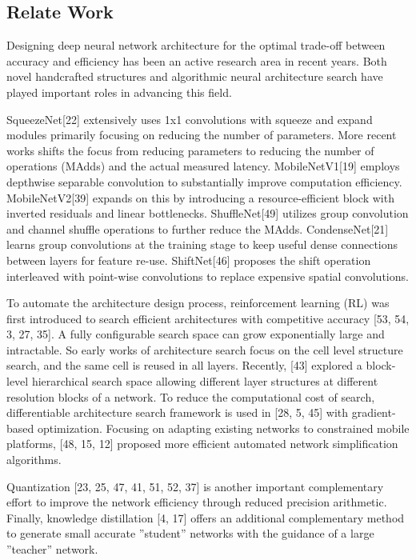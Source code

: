 \subsection{Relate Work}

Designing deep neural network architecture for the optimal trade-off between accuracy and efficiency has been
an active research area in recent years. Both novel handcrafted structures and algorithmic neural architecture search
have played important roles in advancing this field.

SqueezeNet[22] extensively uses 1x1 convolutions with squeeze and expand modules primarily focusing on reducing
the number of parameters. More recent works shifts the focus from reducing parameters to reducing
the number of operations (MAdds) and the actual measured latency. MobileNetV1[19] employs depthwise separable
convolution to substantially improve computation efficiency. MobileNetV2[39] expands on this by introducing
a resource-efficient block with inverted residuals and linear bottlenecks. ShuffleNet[49] utilizes group convolution
and channel shuffle operations to further reduce the MAdds. CondenseNet[21] learns group convolutions at the training
stage to keep useful dense connections between layers for feature re-use. ShiftNet[46] proposes the shift operation interleaved
with point-wise convolutions to replace expensive spatial convolutions.

To automate the architecture design process, reinforcement learning (RL) was first introduced to search efficient
architectures with competitive accuracy [53, 54, 3, 27, 35]. A fully configurable search space can grow exponentially
large and intractable. So early works of architecture search focus on the cell level structure search, and the same cell is
reused in all layers. Recently, [43] explored a block-level hierarchical search space allowing different layer structures
at different resolution blocks of a network. To reduce the computational cost of search, differentiable architecture
search framework is used in [28, 5, 45] with gradient-based optimization. Focusing on adapting existing networks to
constrained mobile platforms, [48, 15, 12] proposed more efficient automated network simplification algorithms.

Quantization [23, 25, 47, 41, 51, 52, 37] is another important complementary effort to improve the network
efficiency through reduced precision arithmetic. Finally, knowledge distillation [4, 17] offers an additional complementary
method to generate small accurate ”student” networks with the guidance of a large ”teacher” network.

